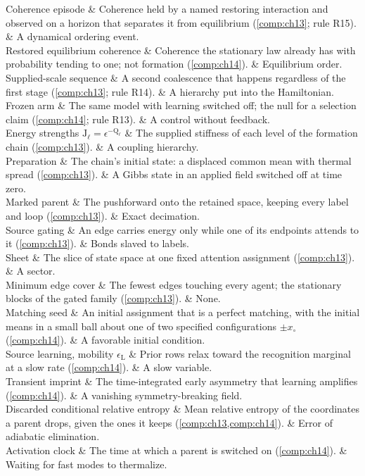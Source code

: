 \begin{decoder}
Coherence episode & Coherence held by a named restoring interaction and observed on a horizon that separates it from equilibrium (\cref{comp:ch13}; rule R15). & A dynamical ordering event. \\
Restored equilibrium coherence & Coherence the stationary law already has with probability tending to one; not formation (\cref{comp:ch14}). & Equilibrium order. \\
Supplied-scale sequence & A second coalescence that happens regardless of the first stage (\cref{comp:ch13}; rule R14). & A hierarchy put into the Hamiltonian. \\
Frozen arm & The same model with learning switched off; the null for a selection claim (\cref{comp:ch14}; rule R13). & A control without feedback. \\
Energy strengths $\mathrm J_\ell=\epsilon^{-\mathrm Q_\ell}$ & The supplied stiffness of each level of the formation chain (\cref{comp:ch13}). & A coupling hierarchy. \\
Preparation & The chain's initial state: a displaced common mean with thermal spread (\cref{comp:ch13}). & A Gibbs state in an applied field switched off at time zero. \\
Marked parent & The pushforward onto the retained space, keeping every label and loop (\cref{comp:ch13}). & Exact decimation. \\
Source gating & An edge carries energy only while one of its endpoints attends to it (\cref{comp:ch13}). & Bonds slaved to labels. \\
Sheet & The slice of state space at one fixed attention assignment (\cref{comp:ch13}). & A sector. \\
Minimum edge cover & The fewest edges touching every agent; the stationary blocks of the gated family (\cref{comp:ch13}). & None. \\
Matching seed & An initial assignment that is a perfect matching, with the initial means in a small ball about one of two specified configurations $\pm x_\circ$ (\cref{comp:ch14}). & A favorable initial condition. \\
Source learning, mobility $\epsilon_{\mathrm L}$ & Prior rows relax toward the recognition marginal at a slow rate (\cref{comp:ch14}). & A slow variable. \\
Transient imprint & The time-integrated early asymmetry that learning amplifies (\cref{comp:ch14}). & A vanishing symmetry-breaking field. \\
Discarded conditional relative entropy & Mean relative entropy of the coordinates a parent drops, given the ones it keeps (\cref{comp:ch13,comp:ch14}). & Error of adiabatic elimination. \\
Activation clock & The time at which a parent is switched on (\cref{comp:ch14}). & Waiting for fast modes to thermalize. \\
\end{decoder}


